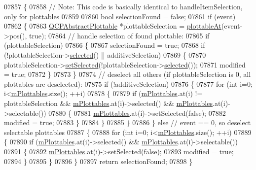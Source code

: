 \begin{DoxyCode}
07857 \{
07858   \textcolor{comment}{// Note: This code is basically identical to handleItemSelection, only for plottables}
07859   
07860   \textcolor{keywordtype}{bool} selectionFound = \textcolor{keyword}{false};
07861   \textcolor{keywordflow}{if} (event)
07862   \{
07863     \hyperlink{a00024}{QCPAbstractPlottable} *plottableSelection = \hyperlink{a00116_ac1d1bc6ae4e13616fb02cef6d9e2188e}{plottableAt}(event->pos(), \textcolor{keyword}{
      true});
07864     \textcolor{comment}{// handle selection of found plottable:}
07865     \textcolor{keywordflow}{if} (plottableSelection)
07866     \{
07867       selectionFound = \textcolor{keyword}{true};
07868       \textcolor{keywordflow}{if} (!plottableSelection->\hyperlink{a00024_ab901903adcb0e29467d63de72340ab29}{selected}() || additiveSelection)
07869       \{
07870         plottableSelection->\hyperlink{a00024_afbd5428c2952f59d952e11ab5cd79176}{setSelected}(!plottableSelection->\hyperlink{a00024_ab901903adcb0e29467d63de72340ab29}{selected}());
07871         modified = \textcolor{keyword}{true};
07872       \}
07873     \}
07874     \textcolor{comment}{// deselect all others (if plottableSelection is 0, all plottables are deselected):}
07875     \textcolor{keywordflow}{if} (!additiveSelection)
07876     \{
07877       \textcolor{keywordflow}{for} (\textcolor{keywordtype}{int} i=0; i<\hyperlink{a00116_a57ed6eb2e0a767a8344de45110a3e81d}{mPlottables}.size(); ++i)
07878       \{
07879         \textcolor{keywordflow}{if} (\hyperlink{a00116_a57ed6eb2e0a767a8344de45110a3e81d}{mPlottables}.at(i) != plottableSelection && \hyperlink{a00116_a57ed6eb2e0a767a8344de45110a3e81d}{mPlottables}.at(i)->selected() 
      && \hyperlink{a00116_a57ed6eb2e0a767a8344de45110a3e81d}{mPlottables}.at(i)->selectable())
07880         \{
07881           \hyperlink{a00116_a57ed6eb2e0a767a8344de45110a3e81d}{mPlottables}.at(i)->setSelected(\textcolor{keyword}{false});
07882           modified = \textcolor{keyword}{true};
07883         \}
07884       \}
07885     \}
07886   \} \textcolor{keywordflow}{else} \textcolor{comment}{// event == 0, so deselect selectable plottables}
07887   \{
07888     \textcolor{keywordflow}{for} (\textcolor{keywordtype}{int} i=0; i<\hyperlink{a00116_a57ed6eb2e0a767a8344de45110a3e81d}{mPlottables}.size(); ++i)
07889     \{
07890       \textcolor{keywordflow}{if} (\hyperlink{a00116_a57ed6eb2e0a767a8344de45110a3e81d}{mPlottables}.at(i)->selected() && \hyperlink{a00116_a57ed6eb2e0a767a8344de45110a3e81d}{mPlottables}.at(i)->selectable())
07891       \{
07892         \hyperlink{a00116_a57ed6eb2e0a767a8344de45110a3e81d}{mPlottables}.at(i)->setSelected(\textcolor{keyword}{false});
07893         modified = \textcolor{keyword}{true};
07894       \}
07895     \}
07896   \}
07897   \textcolor{keywordflow}{return} selectionFound;
07898 \}
\end{DoxyCode}


